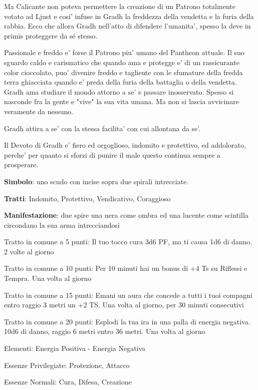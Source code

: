 \documentclass[a4paper,11pt,twoside,openany]{dndbook}
\begin{document}
{Ma Calicante non poteva permettere la creazione di un Patrono totalmente votato ad Ljust e cosi' infuse in Gradh la freddezza della vendetta e la furia della rabbia. Ecco che allora Gradh nell'atto di difendere l'umanita', spesso la deve in primis proteggere da sé stesso.

Passionale e freddo e' forse il Patrono piu' umano del Pantheon attuale. Il suo sguardo caldo e carismatico che quando ama e protegge e' di un rassicurante color cioccolato, puo' divenire freddo e tagliente con le sfumature della fredda terra ghiacciata quando e' preda della furia della battaglia o della vendetta. Gradh ama studiare il mondo attorno a se' e passare inosservato. Spesso si nasconde fra la gente e "vive" la sua vita umana. Ma non si lascia avvicinare veramente da nessuno.

Gradh attira a se' con la stessa facilita' con cui allontana da se'.

Il Devoto di Gradh e' fiero ed orgoglioso, indomito e protettivo, ed addolorato, perche' per quanto si sforzi di punire il male questo continua sempre a prosperare.

\textbf{Simbolo}: uno scudo con incise sopra due spirali intrecciate.

\textbf{Tratti}: Indomito, Protettivo, Vendicativo, Coraggioso

\textbf{Manifestazione}: due spire una nera come ombra ed una lucente come scintilla circondano la sua arma intrecciandosi

\bigskip

Tratto in comune a 5 punti: Il tuo tocco cura 3d6 PF, ma ti causa 1d6 di danno. 2 volte al giorno

Tratto in comune a 10 punti: Per 10 minuti hai un bonus di +4 Ts su Riflessi e Tempra. Una volta al giorno

Tratto in comune a 15 punti: Emani un aura che concede a tutti i tuoi compagni entro raggio 3 metri un +2 TS. Una volta al giorno, per 30 minuti consecutivi

Tratto in comune a 20 punti: Esplodi la tua ira in una palla di energia negativa. 10d6 di danno, raggio 6 metri entro 36 metri. Una volta al giorno

\bigskip

Elementi: Energia Positiva - Energia Negativa

\bigskip

Essenze Privilegiate: Protezione, Attacco

Essenze Normali: Cura, Difesa, Creazione

}
\end{document}
